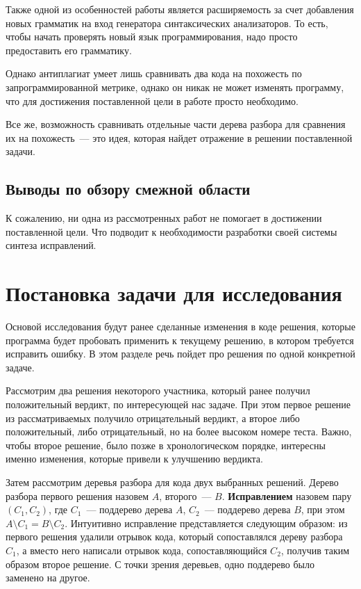 Также одной из особенностей работы является расширяемость за счет добавления новых грамматик на вход 
генератора синтаксических анализаторов. То есть, чтобы начать проверять новый язык программирования, надо
просто предоставить его грамматику.

Однако антиплагиат умеет лишь сравнивать два кода на похожесть по запрограммированной метрике, однако
он никак не может изменять программу, что для достижения поставленной цели в работе просто необходимо.

Все же, возможность сравнивать отдельные части дерева разбора для сравнения их на похожесть~--- это идея,
которая найдет отражение в решении поставленной задачи.                                                                                                       

\subsection{Выводы по обзору смежной области}
К сожалению, ни одна из рассмотренных работ не помогает в достижении поставленной цели.
Что подводит к необходимости разработки своей системы синтеза
исправлений.


\section{Постановка задачи для исследования}
Основой исследования будут ранее сделанные изменения в коде решения, которые программа будет пробовать применить к текущему решению,
в котором требуется исправить ошибку. В этом разделе речь пойдет про решения по одной конкретной задаче.

Рассмотрим два решения некоторого участника, который ранее получил положительный вердикт, по интересующей нас задаче.
При этом первое решение из рассматриваемых получило отрицательный вердикт, а второе либо положительный, либо отрицательный, но
на более высоком номере теста. Важно, чтобы второе решение, было позже в хронологическом порядке, интересны именно изменения, которые
привели к улучшению вердикта.

Затем рассмотрим деревья разбора для кода двух выбранных решений. Дерево разбора первого решения назовем $A$, второго~--- $B$.
\textbf{Исправлением} назовем пару $(C_1, C_2)$, где $C_1$~--- поддерево дерева $A$, $C_2$~--- поддерево дерева $B$,
при этом $A \setminus C_1 = B \setminus C_2$. Интуитивно исправление представляется следующим образом: из первого решения
удалили отрывок кода, который сопоставлялся дереву разбора $C_1$, а вместо него написали отрывок кода, сопоставляющийся $C_2$,
получив таким  образом второе решение. С точки зрения деревьев, одно поддерево было заменено на другое.

